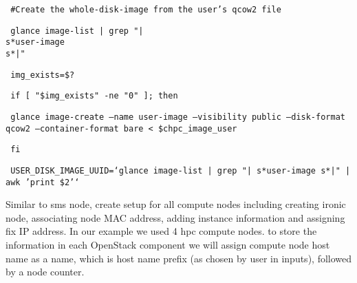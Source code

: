 \documentclass[12pt]{article}
\begin{document}
\begin{bash}\texttt{\small{ \#Create the whole-disk-image from the user's qcow2 file}}\end{bash}
\begin{bash}\texttt{\small{     glance image-list | grep "|\\s*user-image\\s*|"}}\end{bash}
\begin{bash}\texttt{\small{     img\_exists=\$?}}\end{bash}
\begin{bash}\texttt{\small{     if [ "\${img\_exists}" -ne "0" ]; then}}\end{bash}
\begin{bash}\texttt{\small{         glance image-create --name user-image --visibility public --disk-format qcow2 --container-format bare < \${chpc\_image\_user}}}\end{bash}
\begin{bash}\texttt{\small{     fi}}\end{bash}
\begin{bash}\texttt{\small{     USER\_DISK\_IMAGE\_UUID=`glance image-list | grep "|\\s*user-image\\s*|" | awk '{print \$2}'`}}\end{bash}

Similar to sms node, create setup for all compute nodes including creating ironic node, associating node MAC address, adding instance information and assigning fix IP address. In our example we used 4 hpc compute nodes. to store the information in each OpenStack component we will assign compute node host name as a name, which is host name prefix (as chosen by user in inputs), followed by a node counter. 
\end{document}
